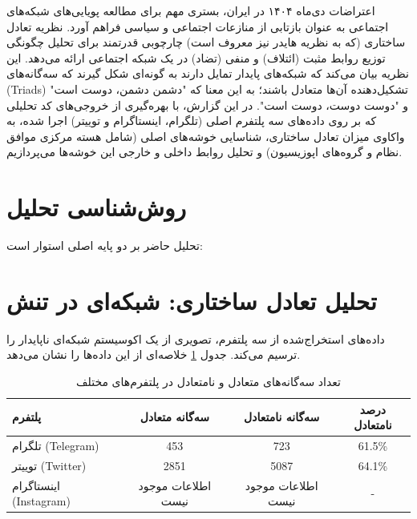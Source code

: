 \documentclass{article}
\begin{document}
\pagestyle{headings}
\maketitle
{}
\newpage

\FloatBarrier


	اعتراضات دی‌ماه ۱۴۰۴ در ایران، بستری مهم برای مطالعه پویایی‌های شبکه‌های اجتماعی به عنوان بازتابی از منازعات اجتماعی و سیاسی فراهم آورد. نظریه تعادل ساختاری (که به نظریه هایدر نیز معروف است) چارچوبی قدرتمند برای تحلیل چگونگی توزیع روابط مثبت (ائتلاف) و منفی (تضاد) در یک شبکه اجتماعی ارائه می‌دهد. این نظریه بیان می‌کند که شبکه‌های پایدار تمایل دارند به گونه‌ای شکل گیرند که سه‌گانه‌های (Triads) تشکیل‌دهنده آن‌ها متعادل باشند؛ به این معنا که "دشمن دشمن، دوست است" و "دوست دوست، دوست است". در این گزارش، با بهره‌گیری از خروجی‌های کد تحلیلی که بر روی داده‌های سه پلتفرم اصلی (تلگرام، اینستاگرام و توییتر) اجرا شده، به واکاوی میزان تعادل ساختاری، شناسایی خوشه‌های اصلی (شامل هسته مرکزی موافق نظام و گروه‌های اپوزیسیون) و تحلیل روابط داخلی و خارجی این خوشه‌ها می‌پردازیم.
	
	\section{روش‌شناسی تحلیل}
	تحلیل حاضر بر دو پایه اصلی استوار است:

	\section{تحلیل تعادل ساختاری: شبکه‌ای در تنش}
	داده‌های استخراج‌شده از سه پلتفرم، تصویری از یک اکوسیستم شبکه‌ای ناپایدار را ترسیم می‌کند. جدول \ref{tab:triads} خلاصه‌ای از این داده‌ها را نشان می‌دهد.
	
	\begin{table}[h!]
		\centering
		\caption{تعداد سه‌گانه‌های متعادل و نامتعادل در پلتفرم‌های مختلف}
		\label{tab:triads}
		\begin{tabular}{@{}lccc@{}}
			\toprule
			\textbf{پلتفرم} & \textbf{سه‌گانه متعادل} & \textbf{سه‌گانه نامتعادل} & \textbf{درصد نامتعادل} \\ \midrule
			تلگرام (Telegram)   & 453                    & 723                      & 61.5\% \\
			توییتر (Twitter)    & 2851                   & 5087                     & 64.1\% \\
			اینستاگرام (Instagram) & اطلاعات موجود نیست       & اطلاعات موجود نیست        & - \\ \bottomrule
		\end{tabular}
	\end{table}
	
\end{document}
